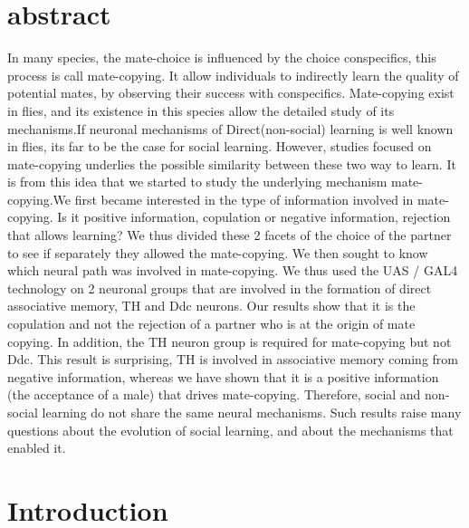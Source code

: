 \documentclass[a4paper, 12pt]{article}
\begin{document}
    \thispagestyle{empty}
    \newpage

   
     \setcounter{page}{1} %
	
	
	\clearpage
	\vspace*{2cm}
	\tableofcontents
	
	\clearpage

\section{abstract}

In many species, the mate-choice is influenced by the choice conspecifics, this process is call mate-copying. It allow individuals to indirectly learn the quality of potential mates, by observing their success with conspecifics. Mate-copying exist in flies, and its existence in this species allow the detailed study of its mechanisms.If neuronal mechanisms of Direct(non-social) learning is well known in flies, its far to be the case for social learning. However, studies focused on mate-copying underlies the possible similarity between these two way to learn. It is from this idea that we started to study the underlying mechanism mate-copying.We first became interested in the type of information involved in mate-copying. Is it positive information, copulation or negative information, rejection that allows learning? We thus divided these 2 facets of the choice of the partner to see if separately they allowed the mate-copying. We then sought to know which neural path was involved in mate-copying. We thus used the UAS / GAL4 technology on 2 neuronal groups that are involved in the formation of direct associative memory, TH and Ddc neurons. Our results show that it is the copulation and not the rejection of a partner who is at the origin of mate copying. In addition, the TH neuron group is required for mate-copying but not Ddc. This result is surprising, TH is involved in associative memory coming from negative information, whereas we have shown that it is a positive information (the acceptance of a male) that drives mate-copying. Therefore, social and non-social learning do not share the same neural mechanisms. Such results raise many questions about the evolution of social learning, and about the mechanisms that enabled it.


	
\section{Introduction}
\end{document}
